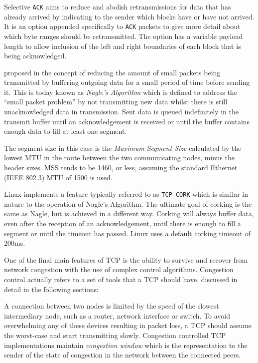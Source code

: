             Selective \texttt{ACK} aims to reduce and abolish retransmissions for data that has already arrived by indicating to the sender which blocks have or have not arrived. It is an option appended specifically to \texttt{ACK} packets to give more detail about which byte ranges should be retransmitted. The option has a variable payload length to allow inclusion of the left and right boundaries of each block that is being acknowledged.

            \citeauthor{rfc896} proposed in \citeyear{rfc896} the concept of reducing the amount of small packets being transmitted by buffering outgoing data for a small period of time before sending it. This is today known as \textit{Nagle's Algorithm} which is defined to address the ``small packet problem'' by not transmitting new data whilst there is still unacknowledged data in transmission. Sent data is queued indefinitely in the transmit buffer until an acknowledgement is received or until the buffer contains enough data to fill at least one segment.

            The segment size in this case is the \textit{Maximum Segment Size} calculated by the lowest MTU in the route between the two communicating nodes, minus the header sizes. MSS tends to be 1460, or less, assuming the standard Ethernet (IEEE 802.3) MTU of 1500 is used.

            Linux implements a feature typically referred to as \texttt{TCP\_CORK} which is similar in nature to the operation of Nagle's Algorithm. The ultimate goal of corking is the same as Nagle, but is achieved in a different way. Corking will always buffer data, even after the reception of an acknowledgement, until there is enough to fill a segment or until the timeout has passed.  Linux uses a default corking timeout of 200ms.

            One of the final main features of TCP is the ability to survive and recover from network congestion with the use of complex control algorithms. Congestion control actually refers to a set of tools that a TCP should have, discussed in detail in the following sections:

            A connection between two nodes is limited by the speed of the slowest intermediary node, such as a router, network interface or switch. To avoid overwhelming any of these devices resulting in packet loss, a TCP should assume the worst-case and start transmitting slowly. Congestion controlled TCP implementations maintain \textit{congestion window} which is the representation to the sender of the state of congestion in the network between the connected peers.

